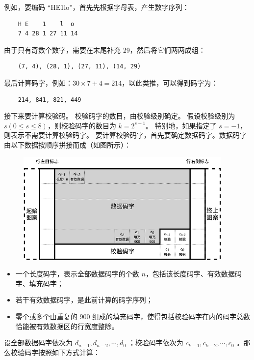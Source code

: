 例如，要编码 “HE1lo”，首先先根据字母表，产生数字序列：

\begin{lstlisting}
    H E    1    l  o
    7 4 28 1 27 11 14
\end{lstlisting}

由于只有奇数个数字，需要在末尾补充 29，然后将它们两两成组：

\begin{lstlisting}
    (7, 4), (28, 1), (27, 11), (14, 29)
\end{lstlisting}

最后计算码字，例如：$30\times 7+4=214$，以此类推，可以得到码字为：

\begin{lstlisting}
    214, 841, 821, 449
\end{lstlisting}

接下来要计算校验码。
校验码字的数目，由校验级别确定。
假设校验级别为 $s(0\le s\le 8)$，则校验码字的数目为 $k=2^{s+1}$。
特别地，如果指定了 $s=-1$，则表示不需要计算校验码字。
要计算校验码字，首先要确定数据码字。数据码字由以下数据按顺序拼接而成（如图所示）：

\begin{figure}[H]
    \centering
    \includegraphics[width=0.95\textwidth]{image/24/3-p-3.png}
\end{figure}

\begin{itemize}
    \item 一个长度码字，表示全部数据码字的个数 $n$，包括该长度码字、有效数据码字、填充码字；
    \item 若干有效数据码字，是此前计算的码字序列；
    \item 零个或多个由重复的 900 组成的填充码字，使得包括校验码字在内的码字总数恰能被有效数据区的行宽度整除。
\end{itemize}

设全部数据码字依次为 $d_{n-1},d_{n-2},\cdots,d_0$
；校验码字依次为 $c_{k-1},c_{k-2},\cdots,c_0$
。那么校验码字按照如下方式计算：

